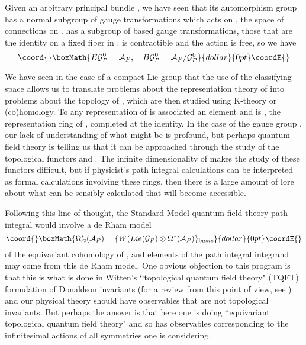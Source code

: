 \documentclass[a4paper,a4paper]{article}
\theoremstyle{conjecture}
\begin{document}
Given an arbitrary principal bundle \coordHE{}, we have seen that its automorphism group
\coordHE{} has a normal subgroup \coordHE{} of gauge transformations which acts
on \coordHE{}, the space of connections on \coordHE{}.  \coordHE{} has a subgroup
\coordHE{} of based gauge transformations, those that are the identity on a fixed
fiber in \coordHE{}.  \coordHE{} is contractible
and the \coordHE{} action is free, so we have
$$\coord{}\boxMath{E{\mathcal G}^0_P={\mathcal A}_P,\ \ \ B{\mathcal G}^0_P={\mathcal A}_P/{\mathcal G}^0_P}{dollar}{0pt}\coordE{}$$

We have seen in the case of a compact Lie group \coordHE{} that the use of the classifying
space \coordHE{} allows us to translate problems about the representation theory of \coordHE{} into
problems about the topology of \coordHE{}, which are then studied using K-theory or (co)homology.
To any representation \coordHE{} of \coordHE{} is associated an element \coordHE{} and
\coordHE{} is \coordHE{}, the representation ring of \coordHE{}, completed at the
identity.  In the case of the gauge group \coordHE{}, our lack of understanding of
what \coordHE{} might be is profound, but perhaps quantum field theory is telling
us that it can be approached through the study of the topological functors
\coordHE{} and \coordHE{}.  The infinite 
dimensionality of
\coordHE{} makes the study of these functors difficult, but if physicist's path
integral calculations can be interpreted as formal calculations involving these rings,
then there is a large amount of lore about what can be sensibly calculated that will become
accessible.

Following this line of thought, the Standard Model quantum field theory path integral
would involve a de Rham model
$$\coord{}\boxMath{\Omega^*_G({\mathcal A}_P)=\{W(Lie({\mathcal G}_P)\otimes \Omega^*({\mathcal A}_P)\}_{\text basic}}{dollar}{0pt}\coordE{}$$
of the equivariant cohomology of \coordHE{}, and elements of
the path integral integrand may come from this de Rham model. One
obvious objection to this program is that this is what is done in
Witten's \lq\lq topological quantum field theory" (TQFT)
formulation of Donaldson invariants \cite{Witten-TQFT} (for a
review from this point of view, see \cite{Cordes-Moore-Ramgoolam})
and our physical theory should have observables that are not
topological invariants.  But perhaps the answer is that here one
is doing \lq\lq equivariant topological quantum field theory" and so has
observables corresponding to the infinitesimal actions of all
symmetries one is considering.  
\end{document}
